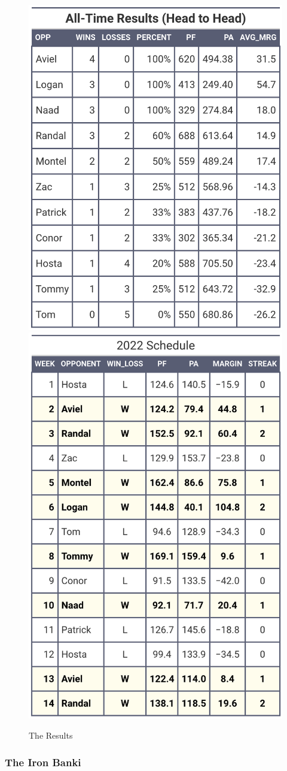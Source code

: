 \documentclass[
]{article}
\begin{document}
\begin{figure}
\includegraphics[width=0.5\linewidth,height=0.5\textheight]{output/headtohead/JP_head_to_head} \includegraphics[width=0.5\linewidth,height=0.5\textheight]{output/py_schedule/season_results_JP} \caption{The Results}\label{fig:unnamed-chunk-7}
\end{figure}

\hypertarget{the-iron-banki}{%
\subsubsection{The Iron Banki}\label{the-iron-banki}}
\end{document}
